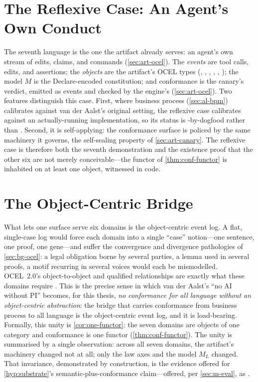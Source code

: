 \section{The Reflexive Case: An Agent's Own Conduct}
\label{sec:al-reflexive}

The seventh language is the one the artifact already serves: an agent's own stream
of edits, claims, and commands (\cref{sec:art-ocel}). The \emph{events} are tool
calls, edits, and assertions; the \emph{objects} are the artifact's OCEL types
(, , , , ,
); the model $M$ is the Declare-encoded constitution; and
conformance is the canary's verdict, emitted as  events and
checked by the engine's  (\cref{sec:art-ocel}). Two features
distinguish this case. First, where business process (\cref{sec:al-bpm}) calibrates
against van der Aalst's original setting, the reflexive case calibrates against an
actually-running implementation, so its status is \admitted-by-dogfood rather than
\candidate. Second, it is self-applying: the conformance surface is policed by the
same machinery it governs, the self-sealing property of \cref{sec:art-canary}. The
reflexive case is therefore both the seventh demonstration and the existence proof
that the other six are not merely conceivable---the functor of
\cref{thm:conf-functor} is inhabited on at least one object, witnessed in code.

\section{The Object-Centric Bridge}
\label{sec:al-bridge}

What lets one surface serve six domains is the object-centric event log. A flat,
single-case log would force each domain into a single ``case'' notion---one
sentence, one proof, one gene---and suffer the convergence and divergence
pathologies of \cref{sec:bg-ocel}: a legal obligation borne by several parties, a
lemma used in several proofs, a motif recurring in several voices would each be
mismodelled. OCEL~2.0's object-to-object and qualified relationships are exactly
what these domains require \citep{ocel2-2024}. This is the precise sense in which
van der Aalst's ``no AI without PI'' \citep{noai-nopi-2025} becomes, for this
thesis, \emph{no conformance for all language without an object-centric
abstraction}: the bridge that carries conformance from business process to all
language is the object-centric event log, and it is load-bearing. Formally, this
unity is \cref{cor:one-functor}: the seven domains are objects of one category and
conformance is one functor (\cref{thm:conf-functor}). The unity is summarised by a
single observation: across all seven domains, the artifact's machinery changed not
at all; only the law axes and the model $M_L$ changed. That
invariance, demonstrated by construction, is the evidence offered for
\cref{hyp:substrate}'s semantic-plus-conformance claim---offered, per
\cref{sec:m-eval}, as \candidate.
